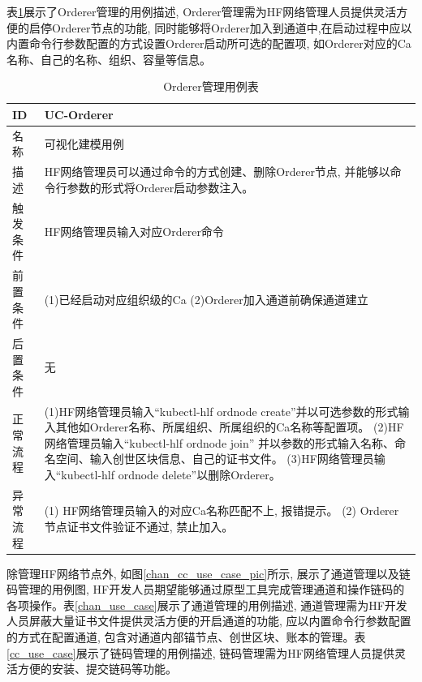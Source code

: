 表\ref{orderer_use_case}展示了Orderer管理的用例描述, Orderer管理需为HF网络管理人员提供灵活方便的启停Orderer节点的功能, 同时能够将Orderer加入到通道中,在启动过程中应以内置命令行参数配置的方式设置Orderer启动所可选的配置项, 如Orderer对应的Ca名称、自己的名称、组织、容量等信息。


{\footnotesize
\begin{longtable}[h]{m{60pt}|m{280pt}}
    \caption[Orderer管理用例表]{Orderer管理用例表} \label{orderer_use_case} \\
        \hline  
        ID&UC-Orderer\\
        \hline
        名称&可视化建模用例\\
        \hline
        描述&HF网络管理员可以通过命令的方式创建、删除Orderer节点, 并能够以命令行参数的形式将Orderer启动参数注入。\\
        \hline
        触发条件&HF网络管理员输入对应Orderer命令\\
        \hline
        前置条件& (1)已经启动对应组织级的Ca
        \newline (2)Orderer加入通道前确保通道建立\\
        \hline
        后置条件&无\\
        \hline
        正常流程& (1)HF网络管理员输入“kubectl-hlf ordnode create”并以可选参数的形式输入其他如Orderer名称、所属组织、所属组织的Ca名称等配置项。
        \newline (2)HF网络管理员输入“kubectl-hlf ordnode join” 并以参数的形式输入名称、命名空间、输入创世区块信息、自己的证书文件。
        \newline (3)HF网络管理员输入“kubectl-hlf ordnode delete”以删除Orderer。\\
        \hline 
        异常流程& (1) HF网络管理员输入的对应Ca名称匹配不上, 报错提示。
        \newline (2) Orderer节点证书文件验证不通过, 禁止加入。 \\
        \hline
    \end{longtable} 
}

除管理HF网络节点外, 如图\ref{chan_cc_use_case_pic}所示, 展示了通道管理以及链码管理的用例图, HF开发人员期望能够通过原型工具完成管理通道和操作链码的各项操作。表\ref{chan_use_case}展示了通道管理的用例描述, 通道管理需为HF开发人员屏蔽大量证书文件提供灵活方便的开启通道的功能, 应以内置命令行参数配置的方式在配置通道, 包含对通道内部锚节点、创世区块、账本的管理。表\ref{cc_use_case}展示了链码管理的用例描述, 链码管理需为HF网络管理人员提供灵活方便的安装、提交链码等功能。

